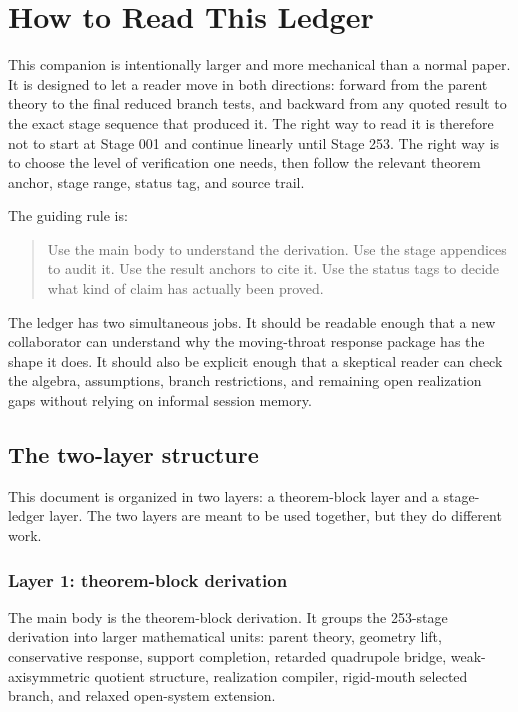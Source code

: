 \chapter{How to Read This Ledger}
\label{chap:how-to-read}

This companion is intentionally larger and more mechanical than a normal paper.  It is designed to let a reader move in both directions: forward from the parent theory to the final reduced branch tests, and backward from any quoted result to the exact stage sequence that produced it.  The right way to read it is therefore not to start at Stage 001 and continue linearly until Stage 253.  The right way is to choose the level of verification one needs, then follow the relevant theorem anchor, stage range, status tag, and source trail.

The guiding rule is:
\begin{quote}
Use the main body to understand the derivation.  Use the stage appendices to audit it.  Use the result anchors to cite it.  Use the status tags to decide what kind of claim has actually been proved.
\end{quote}

The ledger has two simultaneous jobs.  It should be readable enough that a new collaborator can understand why the moving-throat response package has the shape it does.  It should also be explicit enough that a skeptical reader can check the algebra, assumptions, branch restrictions, and remaining open realization gaps without relying on informal session memory.

\section{The two-layer structure}
\label{sec:how-to-read-two-layers}

This document is organized in two layers: a theorem-block layer and a stage-ledger layer.  The two layers are meant to be used together, but they do different work.

\subsection{Layer 1: theorem-block derivation}
\label{subsec:theorem-block-layer}

The main body is the theorem-block derivation.  It groups the 253-stage derivation into larger mathematical units: parent theory, geometry lift, conservative response, support completion, retarded quadrupole bridge, weak-axisymmetric quotient structure, realization compiler, rigid-mouth selected branch, and relaxed open-system extension.

